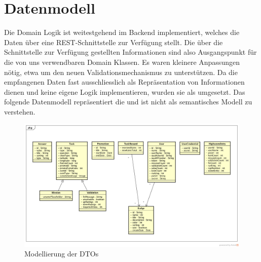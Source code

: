 \label{pd-datenmodell}

\section{Datenmodell}
Die Domain Logik ist weitestgehend im \gls{Backend} implementiert, welches die Daten über eine \gls{REST}-Schnittstelle zur Verfügung stellt.
Die über die Schnittstelle zur Verfügung gestellten Informationen sind also Ausgangspunkt für die von uns verwendbaren Domain Klassen.
Es waren kleinere Anpassungen nötig, etwa um den neuen Validationsmechanismus zu unterstützen.
Da die empfangenen Daten fast ausschliesslich als Repräsentation von Informationen dienen und keine eigene Logik implementieren, wurden sie als  umgesetzt.\newline
Das folgende Datenmodell repräsentiert die  und ist nicht als semantisches Modell zu verstehen.\newline
\begin{figure}[H]
 	\centering
 	\includegraphics[width=\textwidth]{images/projektdokumentation/Datenmodell.png}
 	\caption{Modellierung der DTOs}
 	\label{image-data-model}
\end{figure}
